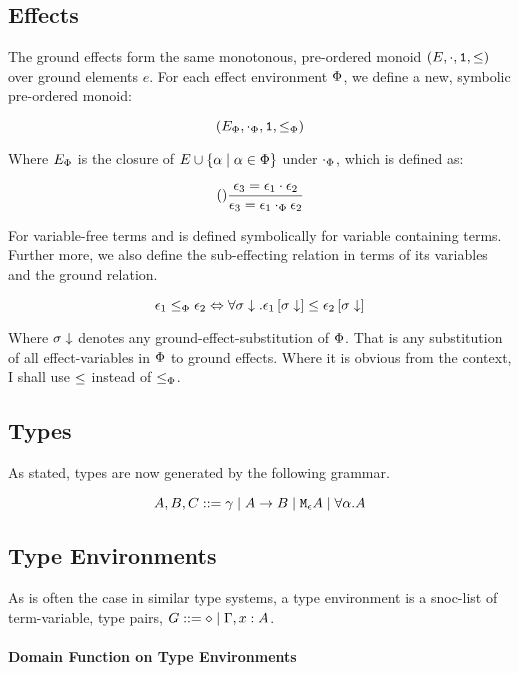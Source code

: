 \documentclass{Report}
\begin{document}
\subsection{Effects}
The ground effects form the same monotonous, pre-ordered monoid $(E, \dot, \1, \subeffect)$ over ground elements $e$. For each effect environment $\P$, we define a new, symbolic pre-ordered monoid:

\begin{equation}
    (E_\P, \dotp, \1, \subeffectp)
\end{equation}

Where $E_\P$ is the closure of $E\cup \left\{\a\mid\a\in\P\right\}$ under $\dotp$, which is defined as:

\begin{equation}
    \treerule{}{\e_3 = \e_1\dot\e_2}{\e_3 = \e_1\dotp\e_2}
\end{equation} 

For variable-free terms and is defined symbolically for variable containing terms. Further more, we also define the sub-effecting relation in terms of its variables and the ground relation.

\begin{equation}
    \e_1 \subeffectp \e_2 \Leftrightarrow \forall \si\downarrow. \e_1\sub{\si\downarrow} \subeffect \e_2\sub{\si\downarrow}
\end{equation}

Where $\si\downarrow$ denotes any ground-effect-substitution of $\P$. That is any substitution of all effect-variables in $\P$ to ground effects. Where it is obvious from the context, I shall use $\subeffect$ instead of $\subeffectp$.


\subsection{Types}
As stated, types are now generated by the following grammar.

$$ A, B, C \gens \ground \mid \ab \mid \mea \mid \all{\a}{A}$$
  
\subsection{Type Environments}
As is often the case in similar type systems, a type environment is a snoc-list of term-variable, type pairs, $G \gens \nil \mid \gax$.

\paragraph{Domain Function on Type Environments}
\end{document}
